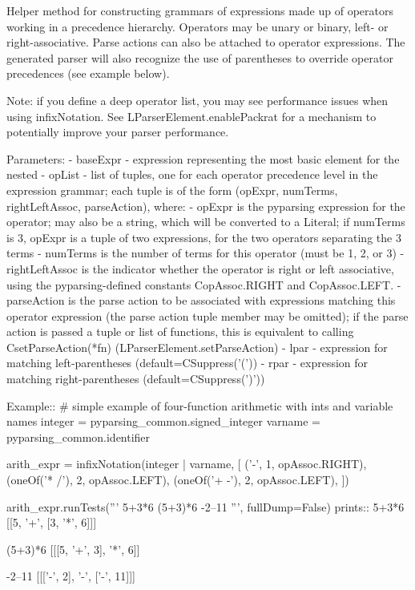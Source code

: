 \begin{DoxyVerb}Helper method for constructing grammars of expressions made up of
operators working in a precedence hierarchy.  Operators may be unary or
binary, left- or right-associative.  Parse actions can also be attached
to operator expressions. The generated parser will also recognize the use 
of parentheses to override operator precedences (see example below).

Note: if you define a deep operator list, you may see performance issues
when using infixNotation. See L{ParserElement.enablePackrat} for a
mechanism to potentially improve your parser performance.

Parameters:
 - baseExpr - expression representing the most basic element for the nested
 - opList - list of tuples, one for each operator precedence level in the
  expression grammar; each tuple is of the form
  (opExpr, numTerms, rightLeftAssoc, parseAction), where:
   - opExpr is the pyparsing expression for the operator;
      may also be a string, which will be converted to a Literal;
      if numTerms is 3, opExpr is a tuple of two expressions, for the
      two operators separating the 3 terms
   - numTerms is the number of terms for this operator (must
      be 1, 2, or 3)
   - rightLeftAssoc is the indicator whether the operator is
      right or left associative, using the pyparsing-defined
      constants C{opAssoc.RIGHT} and C{opAssoc.LEFT}.
   - parseAction is the parse action to be associated with
      expressions matching this operator expression (the
      parse action tuple member may be omitted); if the parse action
      is passed a tuple or list of functions, this is equivalent to
      calling C{setParseAction(*fn)} (L{ParserElement.setParseAction})
 - lpar - expression for matching left-parentheses (default=C{Suppress('(')})
 - rpar - expression for matching right-parentheses (default=C{Suppress(')')})

Example::
    # simple example of four-function arithmetic with ints and variable names
    integer = pyparsing_common.signed_integer
    varname = pyparsing_common.identifier 
    
    arith_expr = infixNotation(integer | varname,
        [
        ('-', 1, opAssoc.RIGHT),
        (oneOf('* /'), 2, opAssoc.LEFT),
        (oneOf('+ -'), 2, opAssoc.LEFT),
        ])
    
    arith_expr.runTests('''
        5+3*6
        (5+3)*6
        -2--11
        ''', fullDump=False)
prints::
    5+3*6
    [[5, '+', [3, '*', 6]]]

    (5+3)*6
    [[[5, '+', 3], '*', 6]]

    -2--11
    [[['-', 2], '-', ['-', 11]]]
\end{DoxyVerb}
 \mbox{\label{namespacepkg__resources_1_1__vendor_1_1pyparsing_a2b9d7cf674162311ae0dfa5938ef17d6}} 

